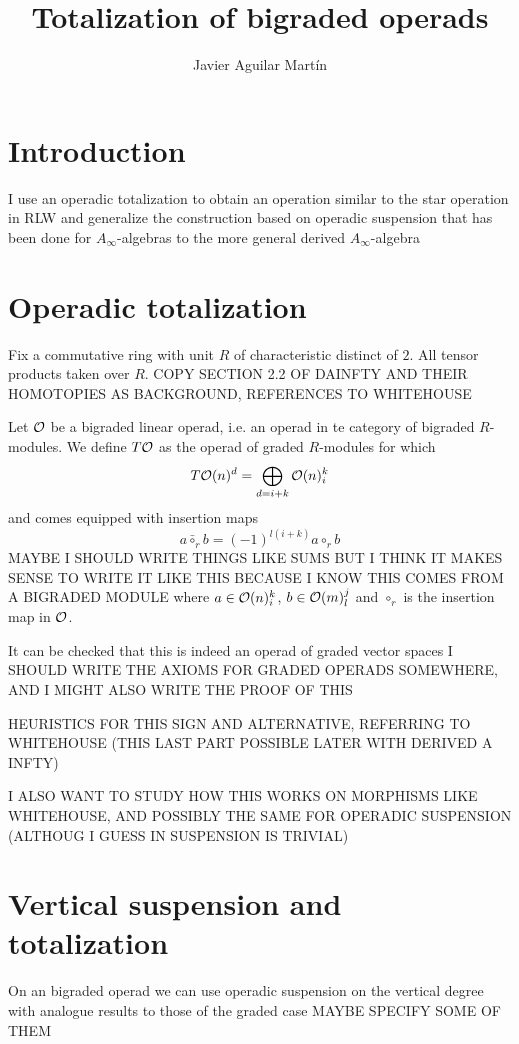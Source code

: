 \documentclass[twoside]{article}
\begin{document}
\title{Totalization of bigraded operads}
\author{Javier Aguilar Martín}
\maketitle

\section{Introduction}
I use an operadic totalization to obtain an operation similar to the star operation in RLW and generalize the construction based on operadic suspension that has been done for $A_\infty$-algebras to the more general derived $A_\infty$-algebra


\section{Operadic totalization}
Fix a commutative ring with unit $R$ of characteristic distinct of $2$. All tensor products taken over $R$. COPY SECTION 2.2 OF DAINFTY AND THEIR HOMOTOPIES AS BACKGROUND, REFERENCES TO WHITEHOUSE

Let ${\mathcal O}$ be a bigraded linear operad, i.e. an operad in te category  of bigraded $R$-modules. We define $T{\mathcal O}$ as the operad of graded $R$-modules for which \[T{\mathcal O}(n)^d=\bigoplus_{d=i+k} {\mathcal O}(n)^k_i\] and comes equipped with insertion maps \[a\bar{\circ}_rb=(-1)^{l(i+k)} a\circ_r b\]
MAYBE I SHOULD WRITE THINGS LIKE SUMS BUT I THINK IT MAKES SENSE TO WRITE IT LIKE THIS BECAUSE I KNOW THIS COMES FROM A BIGRADED MODULE
where $a\in{\mathcal O}(n)^k_i$, $b\in{\mathcal O}(m)^j_l$ and $\circ_r$ is the insertion map in ${\mathcal O}$.

It can be checked that this is indeed an operad of graded vector spaces I SHOULD WRITE THE AXIOMS FOR GRADED OPERADS SOMEWHERE, AND I MIGHT ALSO WRITE THE PROOF OF THIS

HEURISTICS FOR THIS SIGN AND ALTERNATIVE, REFERRING TO WHITEHOUSE (THIS  LAST PART POSSIBLE LATER WITH DERIVED A INFTY)

I ALSO WANT TO STUDY HOW THIS WORKS ON MORPHISMS LIKE WHITEHOUSE, AND POSSIBLY THE SAME FOR OPERADIC SUSPENSION (ALTHOUG I GUESS IN SUSPENSION IS TRIVIAL)

\section{Vertical suspension and totalization}
On an bigraded operad we can use operadic suspension on the vertical degree with analogue results to those of the graded case MAYBE SPECIFY SOME OF THEM
\end{document}
